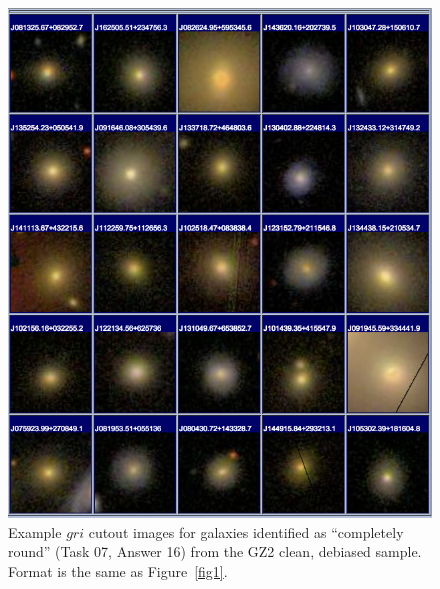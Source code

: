 \documentclass[useAMS,usenatbib]{mn2e}
\begin{document}
\newpage
\clearpage
\begin{figure}
\includegraphics[angle=0,width=7.0in]{figures/gallery/completelyround.png}
\caption{Example $gri$ cutout images for galaxies identified as ``completely round'' (Task 07, Answer 16) from the GZ2 clean, debiased sample. Format is the same as Figure~\ref{fig1}.}
\end{figure}
\end{document}
